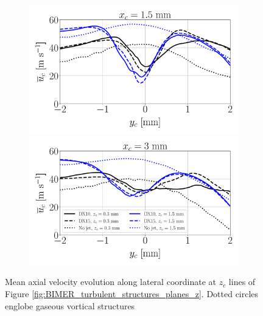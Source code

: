 \begin{figure}[ht]
\centering
\begin{subfigure}[b]{1.0\textwidth}
	\centering
   \includegraphics[scale=0.24]{./part3_applications/figures_ch8_resolved/turbulent_structures/lines_iso_x_along_y_plane_x01p5mm}
   \includegraphics[scale=0.24]{./part3_applications/figures_ch8_resolved/turbulent_structures/lines_iso_x_along_y_plane_x03mm}
\end{subfigure}
   \caption[{Mean axial velocity evolution along lateral coordinate at $z_c$ lines of Figure \ref{fig:BIMER_turbulent_structures_planes_z}}]{Mean axial velocity evolution along lateral coordinate at $z_c$ lines of Figure \ref{fig:BIMER_turbulent_structures_planes_z}. Dotted circles englobe gaseous vortical structures}
\label{fig:BIMER_sps_lines_iso-x_along_y_ux_mean}
\end{figure}

